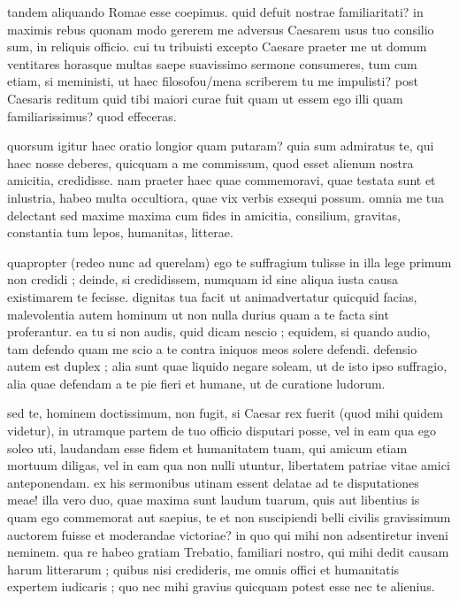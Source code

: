  tandem aliquando Romae esse coepimus. quid defuit nostrae familiaritati? in maximis rebus quonam modo gererem me adversus Caesarem usus tuo consilio sum, in reliquis officio. cui tu tribuisti excepto Caesare praeter me ut domum ventitares horasque multas saepe suavissimo sermone consumeres, tum cum etiam, si meministi, ut haec filosofou/mena scriberem tu me impulisti? post Caesaris reditum quid tibi maiori curae fuit quam ut essem ego illi quam familiarissimus? quod effeceras.

 quorsum igitur haec oratio longior quam putaram? quia sum admiratus te, qui haec nosse deberes, quicquam a me commissum, quod esset alienum nostra amicitia, credidisse. nam praeter haec quae commemoravi, quae testata sunt et inlustria, habeo multa occultiora, quae vix verbis exsequi possum. omnia me tua delectant sed maxime maxima cum fides in amicitia, consilium, gravitas, constantia tum lepos, humanitas, litterae.

 quapropter (redeo nunc ad querelam) ego te suffragium tulisse in illa lege primum non credidi ; deinde, si credidissem, numquam id sine aliqua iusta causa existimarem te fecisse. dignitas tua facit ut animadvertatur quicquid facias, malevolentia autem hominum ut non nulla durius quam a te facta sint proferantur. ea tu si non audis, quid dicam nescio ; equidem, si quando audio, tam defendo quam me scio a te contra iniquos meos solere defendi. defensio autem est duplex ; alia sunt quae liquido negare soleam, ut de isto ipso suffragio, alia quae defendam a te pie fieri et humane, ut de curatione ludorum.

 sed te, hominem doctissimum, non fugit, si Caesar rex fuerit (quod mihi quidem videtur), in utramque partem de tuo officio disputari posse, vel in eam qua ego soleo uti, laudandam esse fidem et humanitatem tuam, qui amicum etiam mortuum diligas, vel in eam qua non nulli utuntur, libertatem patriae vitae amici anteponendam. ex his sermonibus utinam essent delatae ad te disputationes meae! illa vero duo, quae maxima sunt laudum tuarum, quis aut libentius is quam ego commemorat aut saepius, te et non suscipiendi belli civilis gravissimum auctorem fuisse et moderandae victoriae? in quo qui mihi non adsentiretur inveni neminem. qua re habeo gratiam Trebatio, familiari nostro, qui mihi dedit causam harum litterarum ; quibus nisi credideris, me omnis offici et humanitatis expertem iudicaris ; quo nec mihi gravius quicquam potest esse nec te alienius.
